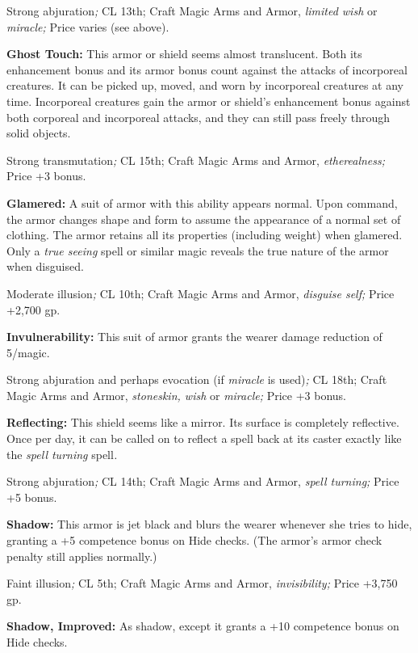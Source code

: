 Strong abjuration\textit{; }CL 13th; Craft Magic Arms and Armor, \textit{limited 
wish }or \textit{miracle; }Price varies (see above).

\textbf{Ghost Touch:} This armor or shield seems almost translucent. Both its enhancement 
bonus and its armor bonus count against the attacks of incorporeal creatures. It 
can be picked up, moved, and worn by incorporeal creatures at any time. Incorporeal 
creatures gain the armor or shield's enhancement bonus against both corporeal and 
incorporeal attacks, and they can still pass freely through solid objects.

Strong transmutation\textit{; }CL 15th; Craft Magic Arms and Armor, \textit{etherealness; 
}Price +3 bonus.

\textbf{Glamered: }A suit of armor with this ability appears normal. Upon command, 
the armor changes shape and form to assume the appearance of a normal set of clothing. 
The armor retains all its properties (including weight) when glamered. Only a \textit{true 
seeing }spell or similar magic reveals the true nature of the armor when disguised.

Moderate illusion\textit{; }CL 10th; Craft Magic Arms and Armor, \textit{disguise 
self; }Price +2,700 gp.

\textbf{Invulnerability:} This suit of armor grants the wearer damage reduction 
of 5/magic.

Strong abjuration and perhaps evocation (if \textit{miracle }is used)\textit{; 
}CL 18th; Craft Magic Arms and Armor, \textit{stoneskin, wish }or \textit{miracle; 
}Price +3 bonus.

\textbf{Reflecting: }This shield seems like a mirror. Its surface is completely 
reflective. Once per day, it can be called on to reflect a spell back at its caster 
exactly like the \textit{spell turning }spell\textit{.}

Strong abjuration\textit{; }CL 14th; Craft Magic Arms and Armor, \textit{spell 
turning; }Price +5 bonus.

\textbf{Shadow:} This armor is jet black and blurs the wearer whenever she tries 
to hide, granting a +5 competence bonus on Hide checks. (The armor's armor check 
penalty still applies normally.)

Faint illusion\textit{; }CL 5th; Craft Magic Arms and Armor, \textit{invisibility; 
}Price +3,750 gp.

\textbf{Shadow, Improved:} As shadow, except it grants a +10 competence bonus on 
Hide checks.

